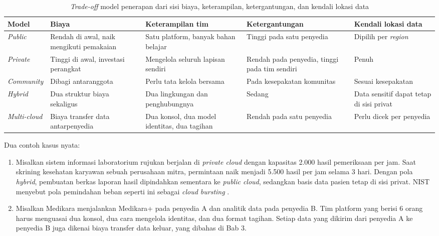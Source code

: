 \begin{table}[!htb]
  \centering
  \caption{\textit{Trade-off} model penerapan dari sisi biaya, keterampilan, ketergantungan,
           dan kendali lokasi data}
  \label{tab:ch02-trade-off-penerapan}
  \footnotesize
  \begin{tabularx}{\textwidth}{>{\raggedright\arraybackslash}p{1.7cm}
      >{\raggedright\arraybackslash}X >{\raggedright\arraybackslash}X
      >{\raggedright\arraybackslash}X >{\raggedright\arraybackslash}X}
    \hline
    \textbf{Model} & \textbf{Biaya} & \textbf{Keterampilan tim} & \textbf{Ketergantungan} &
      \textbf{Kendali lokasi data} \\
    \hline
    \textit{Public} & Rendah di awal, naik mengikuti pemakaian & Satu platform, banyak bahan
      belajar & Tinggi pada satu penyedia & Dipilih per \textit{region} \\
    \hline
    \textit{Private} & Tinggi di awal, investasi perangkat & Mengelola seluruh lapisan sendiri
      & Rendah pada penyedia, tinggi pada tim sendiri & Penuh \\
    \hline
    \textit{Community} & Dibagi antaranggota & Perlu tata kelola bersama & Pada kesepakatan
      komunitas & Sesuai kesepakatan \\
    \hline
    \textit{Hybrid} & Dua struktur biaya sekaligus & Dua lingkungan dan penghubungnya &
      Sedang & Data sensitif dapat tetap di sisi privat \\
    \hline
    \textit{Multi-cloud} & Biaya transfer data antarpenyedia & Dua konsol, dua model
      identitas, dua tagihan & Rendah pada satu penyedia & Perlu dicek per penyedia \\
    \hline
  \end{tabularx}
\end{table}

Dua contoh kasus nyata:
\begin{enumerate}
  \item Misalkan sistem informasi laboratorium rujukan berjalan di \textit{private cloud}
        dengan kapasitas 2.000 hasil pemeriksaan per jam. Saat skrining kesehatan karyawan
        sebuah perusahaan mitra, permintaan naik menjadi 5.500 hasil per jam selama 3 hari.
        Dengan pola \textit{hybrid}, pembuatan berkas laporan hasil dipindahkan sementara ke
        \textit{public cloud}, sedangkan basis data pasien tetap di sisi privat. NIST
        menyebut pola pemindahan beban seperti ini sebagai \textit{cloud bursting}
        \cite{nist800-145}.
  \item Misalkan Medikara menjalankan Medikara+ pada penyedia A dan analitik data pada
        penyedia B. Tim platform yang berisi 6 orang harus menguasai dua konsol, dua cara
        mengelola identitas, dan dua format tagihan. Setiap data yang dikirim dari penyedia A
        ke penyedia B juga dikenai biaya transfer data keluar, yang dibahas di Bab 3.
\end{enumerate}

